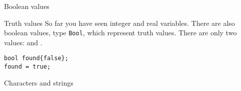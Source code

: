 \begin{comment}
Floating points numbers do not behave like mathematical numbers. 

\begin{block}{Warning: floating point arithmetic}
  \label{sl:float-arith}
  Floating point arithmetic is full of pitfalls.
  \begin{itemize}
  \item Don't count on \lstinline{3*(1./3)} being exactly~1.
  \item Not even associative.
  \end{itemize}
  (See Eijkhout, Introduction to High Performance Computing, chapter~3.)
\end{block}

The following exercise illustrates another point about computer numbers.

\begin{exercise}
  \label{ex:macheps}
  Define 
  \begin{lstlisting}
    float one = 1.;
  \end{lstlisting}
  and
  \begin{enumerate}
  \item Read a \lstinline{float eps},
  \item Make a new variable that has the value \lstinline{one+eps}. Print
    this.
  \item Make another variable that is the previous one minus
    \lstinline{one}. Print the result again.
  \item Test your program with \lstinline{.001}, \lstinline{.0001}, \lstinline{.00001},
    \lstinline{000001}. Do you understand the result?
  \end{enumerate}
\end{exercise}

Complex numbers exist, see section~\ref{sec:stl-complex}.
\end{comment}

 {Boolean values}

\begin{block}{Truth values}
  \label{sl:bool-varj}
  So far you have seen integer and real variables. There are also
  boolean values, type \lstinline{Bool}, which represent truth values. There are
  only two values:  and .
\begin{lstlisting}
bool found{false};
found = true;
\end{lstlisting}
\end{block}

 {Characters and strings}

